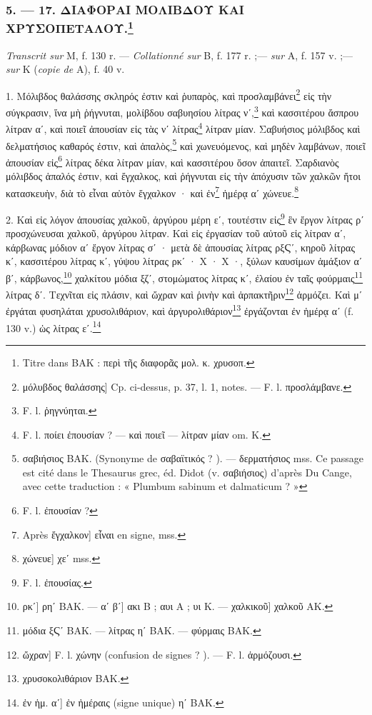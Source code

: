 \documentclass[a4paper, 11pt, oneside, polutonikogreek, french]{article}
\begin{document}
\bigskip
\centerline{\EightStarTaper}
\centerline{\EightStarTaper\EightStarTaper}
\bigskip

\subsubsection[5. --- 17. ΔΙΑΦΟΡΑΙ ΜΟΛΙΒΔΟΥ ΚΑΙ ΧΡΥΣΟΠΕΤΑΛΟΥ.]{5. --- 17. ΔΙΑΦΟΡΑΙ ΜΟΛΙΒΔΟΥ ΚΑΙ ΧΡΥΣΟΠΕΤΑΛΟΥ.\footnote{Titre dans BAK : περὶ τῆς διαφορᾶς μολ. κ. χρυσοπ.}}

\emph{Transcrit sur} M, f. 130 r. --- \emph{Collationné sur} B, f. 177 r. ;--- \emph{sur} A, f. 157 v. ;--- \emph{sur} K (\emph{copie de} A), f. 40 v.

1. Μόλιβδος θαλάσσης σκληρός ἐστιν καὶ ῥυπαρὸς, καὶ προσλαμβάνει\footnote{μόλυβδος θαλάσσης] Cp. ci-dessus, p. 37, l. 1, notes. --- F. l. προσλάμβανε.} εἰς τὴν σύγκρασιν, ἵνα μὴ ῥήγνυται, μολίβδου σαβυησίου λίτρας νʹ,\footnote{F. l. ῥηγνύηται.} καὶ κασσιτέρου ἄσπρου λίτραν αʹ, καὶ ποιεῖ ἀπουσίαν εἰς τὰς νʹ λίτρας\footnote{F. l.  ποίει ἐπουσίαν ? --- καὶ ποιεῖ --- λίτραν μίαν om. Κ.} λίτραν μίαν. Σαβυήσιος μόλιβδος καὶ δελματήσιος καθαρός ἐστιν, καὶ ἁπαλὸς,\footnote{σαβιήσιος BAK. (Synonyme de σαβαϊτικός ? ). --- δερματήσιος mss. Ce passage est cité dans le Thesaurus grec, éd. Didot (v. σαβιήσιος) d'après Du Cange, avec cette traduction : « Plumbum sabinum et dalmaticum ? »} καὶ χωνευόμενος, καὶ μηδὲν λαμβάνων, ποιεῖ ἀπουσίαν εἰς\footnote{F. l. ἐπουσίαν ?} λίτρας δέκα λίτραν μίαν, καὶ κασσιτέρου ὅσον ἀπαιτεῖ. Σαρδιανὸς μόλιβδος ἁπαλός ἐστιν, καὶ ἔγχαλκος, καὶ ῥήγνυται εἰς τὴν ἀπόχυσιν τῶν χαλκῶν ἤτοι κατασκευὴν, διὰ τὸ εἶναι αὐτὸν ἔγχαλκον · καὶ ἐν\footnote{Après ἔγχαλκον] εἶναι en signe, mss.} ἡμέρᾳ αʹ χώνευε.\footnote{χώνευε] χεʹ mss.}

2. Καὶ εἰς λόγον ἀπουσίας χαλκοῦ, ἀργύρου μέρη εʹ, τουτέστιν εἰς\footnote{F. l. ἐπουσίας.} ἓν ἔργον λίτρας ρʹ προσχώνευσαι χαλκοῦ, ἀργύρου λίτραν. Καὶ εἰς ἐργασίαν τοῦ αὐτοῦ εἰς λίτραν αʹ, κάρβωνας μόδιον αʹ ἔργον λίτρας σʹ · μετὰ δὲ ἀπουσίας λίτρας ρξϚʹ, κηροῦ λίτρας κʹ, κασσιτέρου λίτρας κʹ, γύψου λίτρας ρκʹ · Χ · Χ ·, ξύλων καυσίμων ἁμάξιον αʹ βʹ, κάρβωνος,\footnote{ρκʹ] ρηʹ BAK. --- αʹ βʹ] ακι B ; αυι A ; υι K. --- χαλκικοῦ] χαλκοῦ AK.} χαλκίτου μόδια ξζʹ, στομώματος λίτρας κʹ, ἐλαίου ἐν ταῖς φούρμαις\footnote{μόδια ξϚʹ BAK. --- λίτρας ηʹ BAK. --- φύρμαις BAK.} λίτρας δʹ. Τεχνῖται εἰς πλάσιν, καὶ ὤχραν καὶ ῥινὴν καὶ ἁρπακτῆριν\footnote{ὤχραν] F. l. χώνην (confusion de signes ? ). --- F. l. ἁρμόζουσι.} ἀρμόζει. Καὶ μʹ ἐργάται φυσηλάται χρυσολιθάριον, καὶ ἀργυρολιθάριον\footnote{χρυσοκολιθάριον BAK.} ἐργάζονται ἐν ἡμέρᾳ αʹ (f. 130 v.) ὡς λίτρας εʹ.\footnote{ἐν ἡμ. αʹ] ἐν ἠμέραις (signe unique) ηʹ BAK.}
\end{document}
